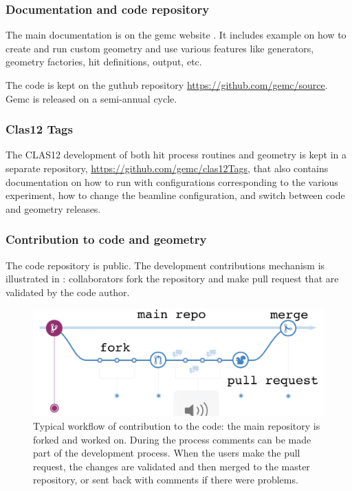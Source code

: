 \subsubsection{Documentation and code repository}

The main documentation is on the gemc website \cite{gemc}. It includes example on how to create and run custom geometry
and use various features like generators, geometry factories, hit definitions, output, etc.

The code is kept on the guthub repository \url{https://github.com/gemc/source}. Gemc is released on a semi-annual cycle.

\subsubsection{Clas12 Tags}
The CLAS12 development of both hit process routines and geometry is kept in a separate repository, \url{https://github.com/gemc/clas12Tags},
that also contains documentation on how to run with configurations corresponding to the various experiment, how to change the
beamline configuration, and switch between code and geometry releases.


\subsubsection{Contribution to code and geometry}

The code repository is public. The development contributions mechanism is illustrated in : collaborators fork the repository
and make pull request that are validated by the code author.

\begin{figure}
	\centering
	\includegraphics[width=0.95\columnwidth,keepaspectratio]{img/github.png}
	\caption{Typical workflow of contribution to the code: the main repository is forked and worked on. During the process comments
             can be made part of the development process. When the users make the pull request, the changes are validated and then merged
             to the master repository, or sent back with comments if there were problems.}
	\label{fig:github}
\end{figure}





